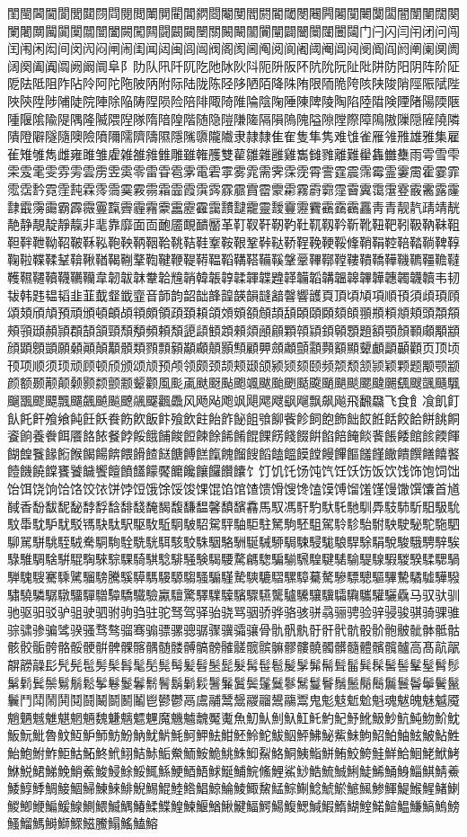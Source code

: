 閨閩閪閫閬閭閮閯閰閱閲閳閴閵閶閷閸閹閺閻閼閽閾閿闀闁闂闃闄闅闆闇闈闉闊闋闌闍闎闏闐闑闒闓闔闕闖闗闘闙闚闛關闝闞闟闠闡闢闣闤闥闦闧门闩闪闫闬闭问闯闰闱闲闳间闵闶闷闸闹闺闻闼闽闾闿阀阁阂阃阄阅阆阇阈阉阊阋阌阍阎阏阐阑阒阓阔阕阖阗阘阙阚阛阜阝阞队阠阡阢阣阤阥阦阧阨阩阪阫阬阭阮阯阰阱防阳阴阵阶阷阸阹阺阻阼阽阾阿陀陁陂陃附际陆陇陈陉陊陋陌降陎陏限陑陒陓陔陕陖陗陘陙陚陛陜陝陞陟陠陡院陣除陥陦陧陨险陪陫陬陭陮陯陰陱陲陳陴陵陶陷陸陹険陻陼陽陾陿隀隁隂隃隄隅隆隇隈隉隊隋隌隍階随隐隑隒隓隔隕隖隗隘隙隚際障隝隞隟隠隡隢隣隤隥隦隧隨隩險隫隬隭隮隯隰隱隲隳隴隵隶隷隸隹隺隻隼隽难隿雀雁雂雃雄雅集雇雈雉雊雋雌雍雎雏雐雑雒雓雔雕雖雗雘雙雚雛雜雝雞雟雠雡離難雤雥雦雧雨雩雪雫雬雭雮雯雰雱雲雳雴雵零雷雸雹雺電雼雽雾雿需霁霂霃霄霅霆震霈霉霊霋霌霍霎霏霐霑霒霓霔霕霖霗霘霙霚霛霜霝霞霟霠霡霢霣霤霥霦霧霨霩霪霫霬霭霮霯霰霱露霳霴霵霶霷霸霹霺霻霼霽霾霿靀靁靂靃靄靅靆靇靈靉靊靋靌靍靎靏靐靑青靓靔靕靖靗靘静靚靛靜靝非靟靠靡面靣靤靥靦靧靨革靪靫靬靭靮靯靰靱靲靳靴靵靶靷靸靹靺靻靼靽靾靿鞀鞁鞂鞃鞄鞅鞆鞇鞈鞉鞊鞋鞌鞍鞎鞏鞐鞑鞒鞓鞔鞕鞖鞗鞘鞙鞚鞛鞜鞝鞞鞟鞠鞡鞢鞣鞤鞥鞦鞧鞨鞩鞪鞫鞬鞭鞮鞯鞰鞱鞲鞳鞴鞵鞶鞷鞸鞹鞺鞻鞼鞽鞾鞿韀韁韂韃韄韅韆韇韈韉韊韋韌韍韎韏韐韑韒韓韔韕韖韗韘韙韚韛韜韝韞韟韠韡韢韣韤韥韦韧韨韩韪韫韬韭韮韯韰韱韲音韴韵韶韷韸韹韺韻韼韽韾響頀頁頂頃頄項順頇須頉頊頋頌頍頎頏預頑頒頓頔頕頖頗領頙頚頛頜頝頞頟頠頡頢頣頤頥頦頧頨頩頪頫頬頭頮頯頰頱頲頳頴頵頶頷頸頹頺頻頼頽頾頿顀顁顂顃顄顅顆顇顈顉顊顋題額顎顏顐顑顒顓顔顕顖顗願顙顚顛顜顝類顟顠顡顢顣顤顥顦顧顨顩顪顫顬顭顮顯顰顱顲顳顴页顶顷顸项顺须顼顽顾顿颀颁颂颃预颅领颇颈颉颊颋颌颍颎颏颐频颒颓颔颕颖颗题颙颚颛颜额颞颟颠颡颢颣颤颥颦颧風颩颪颫颬颭颮颯颰颱颲颳颴颵颶颷颸颹颺颻颼颽颾颿飀飁飂飃飄飅飆飇飈飉飊飋飌飍风飏飐飑飒飓飔飕飖飗飘飙飚飛飜飝飞食飠飡飢飣飤飥飦飧飨飩飪飫飬飭飮飯飰飱飲飳飴飵飶飷飸飹飺飻飼飽飾飿餀餁餂餃餄餅餆餇餈餉養餋餌餍餎餏餐餑餒餓餔餕餖餗餘餙餚餛餜餝餞餟餠餡餢餣餤餥餦餧館餩餪餫餬餭餮餯餰餱餲餳餴餵餶餷餸餹餺餻餼餽餾餿饀饁饂饃饄饅饆饇饈饉饊饋饌饍饎饏饐饑饒饓饔饕饖饗饘饙饚饛饜饝饞饟饠饡饢饣饤饥饦饧饨饩饪饫饬饭饮饯饰饱饲饳饴饵饶饷饸饹饺饻饼饽饾饿馀馁馂馃馄馅馆馇馈馉馊馋馌馍馎馏馐馑馒馓馔馕首馗馘香馚馛馜馝馞馟馠馡馢馣馤馥馦馧馨馩馪馫馬馭馮馯馰馱馲馳馴馵馶馷馸馹馺馻馼馽馾馿駀駁駂駃駄駅駆駇駈駉駊駋駌駍駎駏駐駑駒駓駔駕駖駗駘駙駚駛駜駝駞駟駠駡駢駣駤駥駦駧駨駩駪駫駬駭駮駯駰駱駲駳駴駵駶駷駸駹駺駻駼駽駾駿騀騁騂騃騄騅騆騇騈騉騊騋騌騍騎騏騐騑騒験騔騕騖騗騘騙騚騛騜騝騞騟騠騡騢騣騤騥騦騧騨騩騪騫騬騭騮騯騰騱騲騳騴騵騶騷騸騹騺騻騼騽騾騿驀驁驂驃驄驅驆驇驈驉驊驋驌驍驎驏驐驑驒驓驔驕驖驗驘驙驚驛驜驝驞驟驠驡驢驣驤驥驦驧驨驩驪驫马驭驮驯驰驱驲驳驴驵驶驷驸驹驺驻驼驽驾驿骀骁骂骃骄骅骆骇骈骉骊骋验骍骎骏骐骑骒骓骔骕骖骗骘骙骚骛骜骝骞骟骠骡骢骣骤骥骦骧骨骩骪骫骬骭骮骯骰骱骲骳骴骵骶骷骸骹骺骻骼骽骾骿髀髁髂髃髄髅髆髇髈髉髊髋髌髍髎髏髐髑髒髓體髕髖髗高髙髚髛髜髝髞髟髠髡髢髣髤髥髦髧髨髩髪髫髬髭髮髯髰髱髲髳髴髵髶髷髸髹髺髻髼髽髾髿鬀鬁鬂鬃鬄鬅鬆鬇鬈鬉鬊鬋鬌鬍鬎鬏鬐鬑鬒鬓鬔鬕鬖鬗鬘鬙鬚鬛鬜鬝鬞鬟鬠鬡鬢鬣鬤鬥鬦鬧鬨鬩鬪鬫鬬鬭鬮鬯鬰鬱鬲鬳鬴鬵鬶鬷鬸鬹鬺鬻鬼鬽鬾鬿魀魁魂魃魄魅魆魇魈魉魊魋魌魍魎魏魐魑魒魓魔魕魖魗魘魙魚魛魜魝魞魟魠魡魢魣魤魥魦魧魨魩魪魫魬魭魮魯魰魱魲魳魴魵魶魷魸魹魺魻魼魽魾魿鮀鮁鮂鮃鮄鮅鮆鮇鮈鮉鮊鮋鮌鮍鮎鮏鮐鮑鮒鮓鮔鮕鮖鮗鮘鮙鮚鮛鮜鮝鮞鮟鮠鮡鮢鮣鮤鮥鮦鮧鮨鮩鮪鮫鮬鮭鮮鮯鮰鮱鮲鮳鮴鮵鮶鮷鮸鮹鮺鮻鮼鮽鮾鮿鯀鯁鯂鯃鯄鯅鯆鯇鯈鯉鯊鯋鯌鯍鯎鯏鯐鯑鯒鯓鯔鯕鯖鯗鯘鯙鯚鯛鯜鯝鯞鯟鯠鯡鯢鯣鯤鯥鯦鯧鯨鯩鯪鯫鯬鯭鯮鯯鯰鯱鯲鯳鯴鯵鯶鯷鯸鯹鯺鯻鯼鯽鯾鯿鰀鰁鰂鰃鰄鰅鰆鰇鰈鰉鰊鰋鰌鰍鰎鰏鰐鰑鰒鰓鰔鰕鰖鰗鰘鰙鰚鰛鰜鰝鰞鰟鰠鰡鰢鰣鰤鰥鰦鰧鰨鰩鰪鰫
